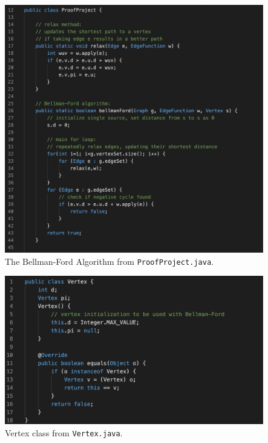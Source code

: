 \documentclass[12pt]{article}
\begin{document}
\begin{figure}[h]
  \centering
    \includegraphics[scale=.5]{figures/bellman-ford.png}
    \caption{The Bellman-Ford Algorithm from \texttt{ProofProject.java}.}
    \label{bellman-ford}
\end{figure}

\begin{figure}[h]
  \centering
    \includegraphics[scale=.5]{figures/vertex.png}
    \caption{Vertex class from \texttt{Vertex.java}.}
\end{figure}
\end{document}
